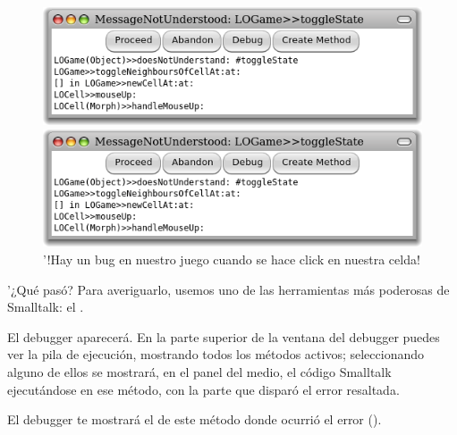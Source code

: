 \documentclass[a4paper,10pt,twoside]{book}
\begin{document}
{\begin{figure}[ht]
\ifluluelse
	{\centerline{\includegraphics[width=\textwidth]{Error}}}
	{\centerline{\includegraphics[scale=0.7]{Error}}}
\caption{'!Hay un bug en nuestro juego cuando se hace click en nuestra celda!
}
\end{figure}

\noindent
'¿Qu\'e pas\'o? Para averiguarlo, usemos uno de las herramientas m\'as poderosas de Smalltalk: el .

El debugger aparecer\'a.
En la parte superior de la ventana del debugger puedes ver la pila de ejecuci\'on, mostrando todos los m\'etodos activos; seleccionando alguno de ellos se mostrar\'a, en el panel del medio, el c\'odigo Smalltalk ejecut\'andose en ese m\'etodo, con la parte que dispar\'o el error resaltada. 

El debugger te mostrar\'a el  de este m\'etodo donde ocurri\'o el error ().

}
\end{document}
